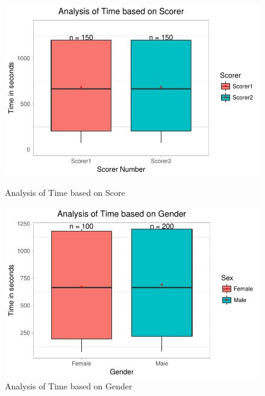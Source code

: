 \documentclass[12pt,epsf]{report}
\begin{document}
\begin{figure}[!htb]
	\begin{minipage}[c]{0.5\linewidth}
	\includegraphics[width=\linewidth]{ScorerVsTime.pdf}
	\caption{Analysis of Time based on Score }
	\end{minipage}
	\hfill
	\begin{minipage}[c]{0.5\linewidth}
	\includegraphics[width=\linewidth]{GenderVsTime.pdf}
	\caption{Analysis of Time based on Gender}
	\end{minipage}
\end{figure}
\end{document}
